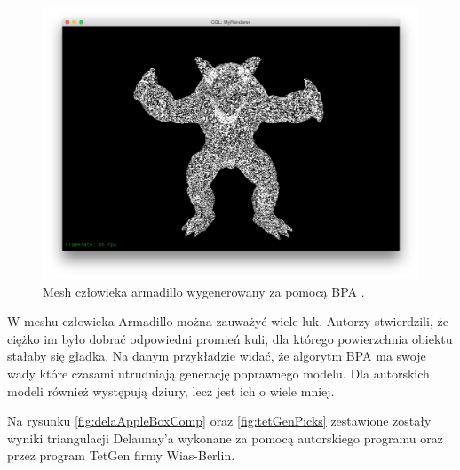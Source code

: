 \begin{figure}[H]
  \centering
  \includegraphics[scale=0.3]{armadilloBpa.png}
  \caption{Mesh człowieka armadillo wygenerowany za pomocą BPA \cite{bpaGit}.}   
  \label{fig:armadillo}
\end{figure}
W meshu człowieka Armadillo można zauważyć wiele luk. Autorzy stwierdzili, że ciężko im było dobrać odpowiedni promień kuli, dla którego powierzchnia obiektu stałaby się gładka. Na danym przykładzie widać, że algorytm BPA ma swoje wady które czasami utrudniają generację poprawnego modelu. Dla autorskich modeli również występują dziury, lecz jest ich o wiele mniej.

Na rysunku \ref{fig:delaAppleBoxComp} oraz \ref{fig:tetGenPicks} zestawione zostały wyniki triangulacji Delaunay'a wykonane za pomocą autorskiego programu oraz przez program TetGen firmy Wias-Berlin.

